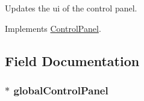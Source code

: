 Updates the ui of the control panel. 



Implements \hyperlink{classGUI_1_1ControlPanel_aa9963358cf9cff5ea2531d73efa78f73}{Control\+Panel}.



\subsection{Field Documentation}
\hypertarget{classGUI_1_1GlobalControlPanel_a360a35388d458c292758e61a66d77674}{}
\subsubsection[{global\+Control\+Panel}]{$\ast$ global\+Control\+Panel}\label{classGUI_1_1GlobalControlPanel_a360a35388d458c292758e61a66d77674}
